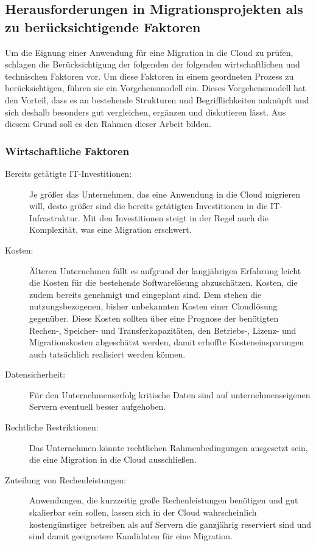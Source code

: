 \subsection{Herausforderungen in Migrationsprojekten als zu berücksichtigende 
Faktoren}
Um die Eignung einer Anwendung für eine Migration in die Cloud zu prüfen, 
schlagen  die Berücksichtigung der folgenden der 
folgenden wirtschaftlichen und technischen Faktoren vor. Um diese Faktoren in 
einem geordneten Prozess zu berücksichtigen, führen sie ein Vorgehensmodell 
ein. Dieses Vorgehensmodell hat den Vorteil, dass es an bestehende Strukturen 
und Begrifflichkeiten anknüpft und sich deshalb besonders gut vergleichen, 
ergänzen und diskutieren lässt. Aus diesem Grund soll es den Rahmen dieser 
Arbeit bilden.

\subsubsection{Wirtschaftliche Faktoren}
\begin{description}
	\item[Bereits getätigte IT-Investitionen:]
	Je größer das Unternehmen, das eine Anwendung in die Cloud migrieren 
will, desto größer sind die bereits getätigten Investitionen in die 
IT-Infrastruktur. Mit den Investitionen steigt in der Regel auch die 
Komplexität, was eine Migration erschwert.
	\item[Kosten:] Älteren Unternehmen fällt es aufgrund der langjährigen 
Erfahrung leicht die Kosten für die bestehende Softwarelösung abzuschätzen. 
Kosten, die zudem bereits genehmigt und eingeplant sind. Dem stehen die 
nutzungsbezogenen, bisher unbekannten Kosten einer Cloudlösung gegenüber. Diese 
Kosten sollten über eine Prognose der benötigten Rechen-, Speicher- und 
Transferkapazitäten, den Betriebs-, Lizenz- und Migrationskosten abgeschätzt 
werden, damit erhoffte Kosteneinsparungen auch tatsächlich realisiert werden 
können.
	\item[Datensicherheit:] Für den Unternehmenserfolg kritische Daten sind 
auf unternehmenseigenen Servern eventuell besser aufgehoben.
	\item[Rechtliche Restriktionen:] Das Unternehmen könnte rechtlichen 
Rahmenbedingungen ausgesetzt sein, die eine Migration in die Cloud ausschließen.
	\item[Zuteilung von Rechenleistungen:] Anwendungen, die kurzzeitig 
große Rechenleistungen benötigen und gut skalierbar sein sollen, lassen sich in 
der Cloud wahrscheinlich kostengünstiger betreiben als auf Servern die 
ganzjährig reserviert sind und sind damit geeignetere Kandidaten für eine 
Migration.
\end{description}


